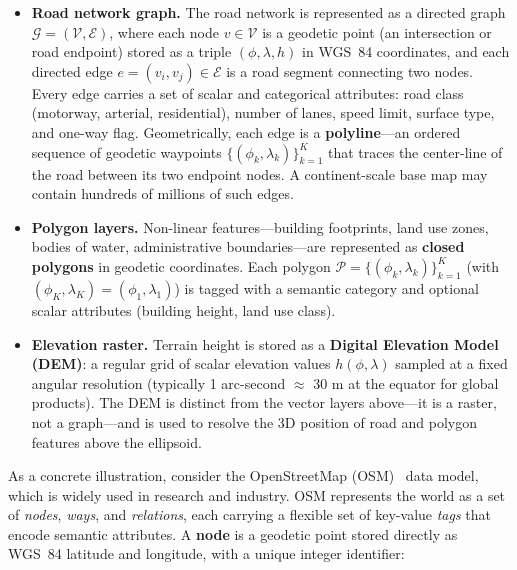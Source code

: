 \documentclass{book}
\begin{document}
\begin{itemize}
  \item \textbf{Road network graph.}  The road network is represented
    as a directed graph $\mathcal{G} = (\mathcal{V}, \mathcal{E})$,
    where each node $v \in \mathcal{V}$ is a geodetic point (an
    intersection or road endpoint) stored as a triple
    $(\phi, \lambda, h)$ in WGS~84 coordinates, and each directed edge
    $e = (v_i, v_j) \in \mathcal{E}$ is a road segment connecting two
    nodes.  Every edge carries a set of scalar and categorical
    attributes: road class (motorway, arterial, residential), number
    of lanes, speed limit, surface type, and one-way flag.
    Geometrically, each edge is a \textbf{polyline}---an ordered
    sequence of geodetic waypoints $\{(\phi_k, \lambda_k)\}_{k=1}^{K}$
    that traces the center-line of the road between its two endpoint
    nodes.  A continent-scale base map may contain hundreds of millions
    of such edges.

  \item \textbf{Polygon layers.}  Non-linear features---building
    footprints, land use zones, bodies of water, administrative
    boundaries---are represented as \textbf{closed polygons} in
    geodetic coordinates.  Each polygon $\mathcal{P} =
    \{(\phi_k, \lambda_k)\}_{k=1}^{K}$ (with $(\phi_K, \lambda_K) =
    (\phi_1, \lambda_1)$) is tagged with a semantic category and
    optional scalar attributes (building height, land use class).

  \item \textbf{Elevation raster.}  Terrain height is stored as a
    \textbf{Digital Elevation Model (DEM)}: a regular grid of scalar
    elevation values $h(\phi, \lambda)$ sampled at a fixed angular
    resolution (typically 1 arc-second $\approx$ 30 m at the equator
    for global products).  The DEM is distinct from the vector layers
    above---it is a raster, not a graph---and is used to resolve the
    3D position of road and polygon features above the ellipsoid.
\end{itemize}

As a concrete illustration, consider the OpenStreetMap
(OSM)~\cite{haklay2008openstreetmap} data model, which is widely used
in research and industry.  OSM represents the world as a set of
\emph{nodes}, \emph{ways}, and \emph{relations}, each carrying a
flexible set of key-value \emph{tags} that encode semantic attributes.
A \textbf{node} is a geodetic point stored directly as WGS~84
latitude and longitude, with a unique integer identifier:
\end{document}
